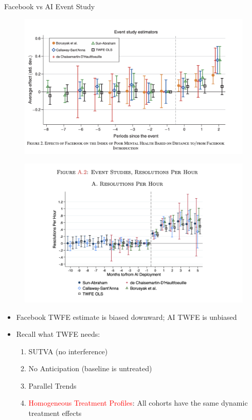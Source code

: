 \documentclass{beamer}
\begin{document}
\begin{frame}{Facebook vs AI Event Study}
\begin{multicols}{2}

\begin{figure}
\includegraphics[width=0.95\linewidth, keepaspectratio]{./lecture_includes/facebook_3}
\end{figure}

\begin{figure}
\includegraphics[width=0.95\linewidth, keepaspectratio]{./lecture_includes/genai_alldid}
\end{figure}

\end{multicols}

\begin{itemize}
\item Facebook TWFE estimate is biased downward; AI TWFE is unbiased
\item Recall what TWFE needs:
	\begin{enumerate}
	\item SUTVA (no interference)
	\item No Anticipation (baseline is untreated)
	\item Parallel Trends
	\item \textcolor{red}{Homogeneous Treatment Profiles}: All cohorts have the same dynamic treatment effects
	\end{enumerate}
\end{itemize}

\end{frame}
\end{document}
